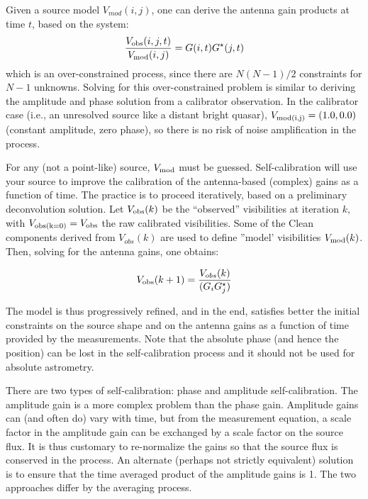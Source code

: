 Given a source model $V_{mod}(i,j)$, one can derive the antenna gain
products at time $t$, based on the system:
 \begin{equation}
  \frac{V_{\rm obs}(i,j,t)}{V_{\rm mod}(i,j)} = G(i,t) G^{{\star}}(j,t) 
  \end{equation}
which is an over-constrained process, since there are $N(N-1)/2$ 
constraints for $N-1$ unknowns. Solving for this over-constrained 
problem is similar to deriving the amplitude and phase solution from a 
calibrator observation. In the calibrator case (i.e., an unresolved 
source like a distant bright quasar), $V_{\rm mod(i,j)} = (1.0,0.0)$ 
(constant amplitude, zero phase), so there is no risk of noise 
amplification in the process. 

For any (not a point-like) source, $V_{\rm mod}$ must be guessed. 
Self-calibration will use your source to improve the calibration of the 
antenna-based (complex) gains as a function of time. The practice is to 
proceed iteratively, based on a preliminary deconvolution solution. Let 
$V_{\rm obs}(k)$ be the ``observed'' visibilities at iteration $k$, with 
$V_{\rm obs(k=0)} = V_{\rm obs} $ the raw calibrated visibilities. Some 
of the Clean components derived from $V_{obs}(k)$ are used to define 
''model' visibilities $V_{\rm mod}(k)$. Then, solving for the antenna 
gains, one obtains: 

\begin{equation}
V_{\rm obs}(k+1) = \frac {V_{obs}(k)}{(G_i G^{{\star}}_j)}
\end{equation}

The model is thus progressively refined, and in the end, satisfies 
better the initial constraints on the source shape and on the antenna 
gains as a function of time provided by the measurements. Note that the 
absolute phase (and hence the position) can be lost in the 
self-calibration process and it should not be used for absolute 
astrometry.

There are two types of self-calibration: phase and amplitude self-calibration. 
The amplitude gain is a more complex problem than the phase gain.
Amplitude gains can (and often do) vary with time, but from the
measurement equation, a scale factor in the amplitude gain can be
exchanged by a scale factor on the source flux. It is thus customary
to re-normalize the gains so that the source flux is conserved
in the process. An alternate (perhaps not strictly equivalent) solution 
is to ensure that the time averaged product of the amplitude gains is 1.
The two approaches differ by the averaging process.

